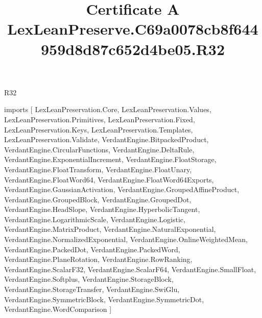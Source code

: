 \begin{lexlean}{R32}
\title{Certificate A LexLeanPreserve.C69a0078cb8f644959d8d87c652d4be05.R32}
\begin{coremodule}
imports [
  LexLeanPreservation.Core,
  LexLeanPreservation.Values,
  LexLeanPreservation.Primitives,
  LexLeanPreservation.Fixed,
  LexLeanPreservation.Keys,
  LexLeanPreservation.Templates,
  LexLeanPreservation.Validate,
  VerdantEngine.BitpackedProduct,
  VerdantEngine.CircularFunctions,
  VerdantEngine.DeltaRule,
  VerdantEngine.ExponentialIncrement,
  VerdantEngine.FloatStorage,
  VerdantEngine.FloatTransform,
  VerdantEngine.FloatUnary,
  VerdantEngine.FloatWord64,
  VerdantEngine.FloatWord64Exports,
  VerdantEngine.GaussianActivation,
  VerdantEngine.GroupedAffineProduct,
  VerdantEngine.GroupedBlock,
  VerdantEngine.GroupedDot,
  VerdantEngine.HeadSlope,
  VerdantEngine.HyperbolicTangent,
  VerdantEngine.LogarithmicScale,
  VerdantEngine.Logistic,
  VerdantEngine.MatrixProduct,
  VerdantEngine.NaturalExponential,
  VerdantEngine.NormalizedExponential,
  VerdantEngine.OnlineWeightedMean,
  VerdantEngine.PackedDot,
  VerdantEngine.PackedWord,
  VerdantEngine.PlaneRotation,
  VerdantEngine.RowRanking,
  VerdantEngine.ScalarF32,
  VerdantEngine.ScalarF64,
  VerdantEngine.SmallFloat,
  VerdantEngine.Softplus,
  VerdantEngine.StorageBlock,
  VerdantEngine.StorageTransfer,
  VerdantEngine.SwiGlu,
  VerdantEngine.SymmetricBlock,
  VerdantEngine.SymmetricDot,
  VerdantEngine.WordComparison
]


\end{coremodule}
\end{lexlean}
